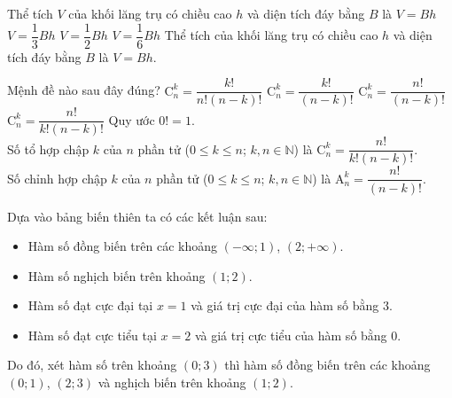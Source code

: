 \begin{ex}%
 Thể tích $V$ của khối lăng trụ có chiều cao $h$ và diện tích đáy bằng $B$ là
 \choice
  {\True $V = Bh$}
  {$V = \dfrac{1}{3} Bh$}
  {$V = \dfrac{1}{2} Bh$}
  {$V = \dfrac{1}{6} Bh$}
 \loigiai
  {
  Thể tích của khối lăng trụ có chiều cao $h$ và diện tích đáy bằng $B$ là $V = Bh$.
  }
\end{ex}


\begin{ex}%
 Mệnh đề nào sau đây đúng?
 \choice
  {$\mathrm{C}_n^k = \dfrac{k!}{n!(n - k)!}$}
  {$\mathrm{C}_n^k = \dfrac{k!}{(n - k)!}$}
  {$\mathrm{C}_n^k = \dfrac{n!}{(n - k)!}$}
  {\True $\mathrm{C}_n^k = \dfrac{n!}{k!(n - k)!}$}
 \loigiai
  {
  Quy ước $0! = 1$.\\
  Số tổ hợp chập $k$ của $n$ phần tử ($0 \leq k \leq n$; $k, n \in \mathbb{N}$) là $\mathrm{C}_n^k = \dfrac{n!}{k!(n - k)!}$.\\
  Số chỉnh hợp chập $k$ của $n$ phần tử ($0 \leq k \leq n$; $k, n \in \mathbb{N}$) là $\mathrm{A}_n^k = \dfrac{n!}{(n - k)!}$.
  }
\end{ex}


\begin{ex}%
  {
  }
 \loigiai
  {
  Dựa vào bảng biến thiên ta có các kết luận sau:
  \begin{itemize}
   \item Hàm số đồng biến trên các khoảng $(-\infty; 1)$, $(2; +\infty)$.
   \item Hàm số nghịch biến trên khoảng $(1;2)$.
   \item Hàm số đạt cực đại tại $x = 1$ và giá trị cực đại của hàm số bằng $3$.
   \item Hàm số đạt cực tiểu tại $x = 2$ và giá trị cực tiểu của hàm số bằng $0$.
  \end{itemize}
  Do đó, xét hàm số trên khoảng $(0;3)$ thì hàm số đồng biến trên các khoảng $(0;1)$, $(2;3)$ và nghịch biến trên khoảng $(1;2)$.
  }
\end{ex}


